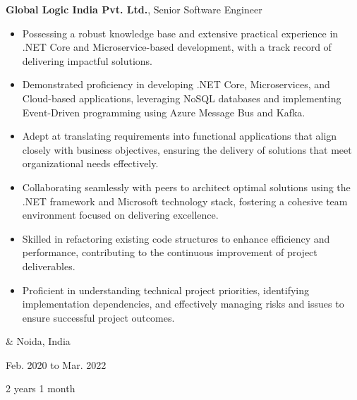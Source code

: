 \documentclass[10pt, letterpaper]{article}
\newenvironment{highlights}{
        \begin{itemize}[
                topsep=0pt,
                parsep=0.10 cm,
                partopsep=0pt,
                itemsep=0pt,
                after=\vspace{-1\baselineskip},
                leftmargin=0.4 cm + 3pt
            ]
    }{
        \end{itemize}
    } %
\let\originalTabularx\tabularx
\let\originalEndTabularx\endtabularx
\renewenvironment{tabularx}{\bgroup\centering\originalTabularx}{\originalEndTabularx\par\egroup}
\begin{document}
        \vspace{0.2 cm}
        \begin{tabularx}{
            \textwidth-0.4 cm-0.13cm
        }{
            K{0.2 cm}
            R{4.1 cm}
        }
            \textbf{Global Logic India Pvt. Ltd.}, Senior Software Engineer

            \vspace{0.10 cm}

            \begin{highlights}
                \item Possessing a robust knowledge base and extensive practical experience in .NET Core and Microservice-based development, with a track record of delivering impactful solutions.
                \item Demonstrated proficiency in developing .NET Core, Microservices, and Cloud-based applications, leveraging NoSQL databases and implementing Event-Driven programming using Azure Message Bus and Kafka.
                \item Adept at translating requirements into functional applications that align closely with business objectives, ensuring the delivery of solutions that meet organizational needs effectively.
                \item Collaborating seamlessly with peers to architect optimal solutions using the .NET framework and Microsoft technology stack, fostering a cohesive team environment focused on delivering excellence.
                \item Skilled in refactoring existing code structures to enhance efficiency and performance, contributing to the continuous improvement of project deliverables.
                \item Proficient in understanding technical project priorities, identifying implementation dependencies, and effectively managing risks and issues to ensure successful project outcomes.
            \end{highlights}
            &
            Noida, India

            Feb. 2020 to Mar. 2022

            2 years 1 month
        \end{tabularx}
\end{document}
